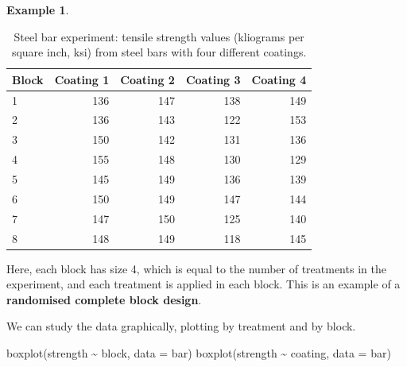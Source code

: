 \documentclass[
]{book}
\newenvironment{Shaded}{\begin{snugshade}}{\end{snugshade}}
\newcommand{\AttributeTok}[1]{\textcolor[rgb]{0.77,0.63,0.00}{#1}}
\newcommand{\FunctionTok}[1]{\textcolor[rgb]{0.00,0.00,0.00}{#1}}
\newcommand{\NormalTok}[1]{#1}
\newcommand{\SpecialCharTok}[1]{\textcolor[rgb]{0.00,0.00,0.00}{#1}}
\theoremstyle{definition}
\theoremstyle{definition}
\newtheorem{example}{Example}[chapter]
\theoremstyle{definition}
\theoremstyle{definition}
\theoremstyle{remark}
\begin{document}
\begin{example}
\begin{table}
\caption{\label{tab:bar-expt-data}Steel bar experiment: tensile strength values (kliograms per square inch, ksi) from steel bars with four different coatings.}
\centering
\begin{tabular}[t]{l|r|r|r|r}
\hline
Block & Coating 1 & Coating 2 & Coating 3 & Coating 4\\
\hline
1 & 136 & 147 & 138 & 149\\
\hline
2 & 136 & 143 & 122 & 153\\
\hline
3 & 150 & 142 & 131 & 136\\
\hline
4 & 155 & 148 & 130 & 129\\
\hline
5 & 145 & 149 & 136 & 139\\
\hline
6 & 150 & 149 & 147 & 144\\
\hline
7 & 147 & 150 & 125 & 140\\
\hline
8 & 148 & 149 & 118 & 145\\
\hline
\end{tabular}
\end{table}

Here, each block has size 4, which is equal to the number of treatments in the experiment, and each treatment is applied in each block. This is an example of a \textbf{randomised complete block design}.

We can study the data graphically, plotting by treatment and by block.

\begin{Shaded}
\begin{Highlighting}[]
\FunctionTok{boxplot}\NormalTok{(strength }\SpecialCharTok{\textasciitilde{}}\NormalTok{ block, }\AttributeTok{data =}\NormalTok{ bar)}
\FunctionTok{boxplot}\NormalTok{(strength }\SpecialCharTok{\textasciitilde{}}\NormalTok{ coating, }\AttributeTok{data =}\NormalTok{ bar)}
\end{Highlighting}
\end{Shaded}

\begin{figure}


\end{figure}
\end{example}
\end{document}
